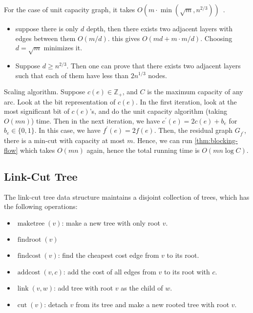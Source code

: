 For the case of unit capacity graph, it takes \(O(m \cdot \min (\sqrt{m} , n^{2 / 3}))\)~\cite{even1975network}.
\begin{itemize}
	\item suppose there is only \(d\) depth, then there exists two adjacent layers with edges between them \(O(m / d)\). this gives \(O(md + m \cdot m / d)\). Choosing \(d = \sqrt{m} \) minimizes it.
	\item Suppose \(d \geq n^{2 / 3}\). Then one can prove that there exists two adjacent layers such that each of them have less than \(2 n^{1 / 3}\) nodes.
\end{itemize}

Scaling algorithm. Suppose \(c(e) \in \mathbb{Z} _{+}\), and \(C\) is the maximum capacity of any arc. Look at the bit representation of \(c(e)\). In the first iteration, look at the most significant bit of \(c(e)\)'s, and do the unit capacity algorithm (taking \(O(mn)\)) time. Then in the next iteration, we have \(c^{\prime} (e) = 2 c(e) + b_e\) for \(b_e \in \{ 0, 1 \} \). In this case, we have \(f^{\prime} (e) = 2 f(e)\). Then, the residual graph \(G_{f^{\prime} }\), there is a min-cut with capacity at most \(m\). Hence, we can run \autoref{thm:blocking-flow} which takes \(O(mn)\) again, hence the total running time is \(O(mn \log C)\).

\subsection{Link-Cut Tree}
\begin{definition}\label{def:link-cut-tree}

\end{definition}
The link-cut tree data structure maintains a disjoint collection of trees, which has the following operations:
\begin{itemize}
	\item \(\operatorname{maketree}(v) \): make a new tree with only root \(v\).
	\item \(\operatorname{findroot}(v) \)
	\item \(\operatorname{findcost}(v) \): find the cheapest cost edge from \(v\) to its root.
	\item \(\operatorname{addcost}(v, c) \): add the cost of all edges from \(v\) to its root with \(c\).
	\item \(\operatorname{link}(v, w) \): add tree with root \(v\) as the child of \(w\).
	\item \(\operatorname{cut}(v) \): detach \(v\) from its tree and make a new rooted tree with root \(v\).
\end{itemize}

